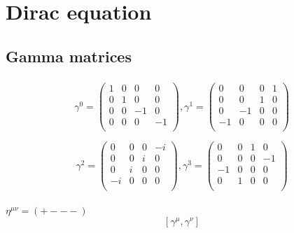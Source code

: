 %
%
%
%
%
\section{Dirac equation}

\subsection{Gamma matrices}
\subsubsection{}
\[
\gamma^0 =\left(
\begin{array}{cccc}
1& 0 & 0 & 0 \\
0& 1 & 0 & 0 \\
0& 0 & -1 & 0 \\
0& 0 & 0 & -1 \\
\end{array}
\right)
,
\gamma^1 =\left(
\begin{array}{cccc}
0& 0 & 0 & 1 \\
0& 0 & 1 & 0 \\
0& -1 & 0 & 0 \\
-1& 0 & 0 & 0 \\
\end{array}
\right)
\]

\[
\gamma^2 =\left(
\begin{array}{cccc}
0& 0 & 0 & -i \\
0& 0 & i & 0 \\
0& i & 0 & 0 \\
-i& 0 & 0 & 0 \\
\end{array}
\right)
,
\gamma^3 =\left(
\begin{array}{cccc}
0& 0 & 1 & 0 \\
0& 0 & 0 & -1 \\
-1& 0 & 0 & 0 \\
0& 1 & 0 & 0 \\
\end{array}
\right)
\]

\subsubsection{}
$ \eta^{\mu \nu } = ( +---) $
\[ \left[ \gamma^\mu , \gamma^\nu \right] \]
